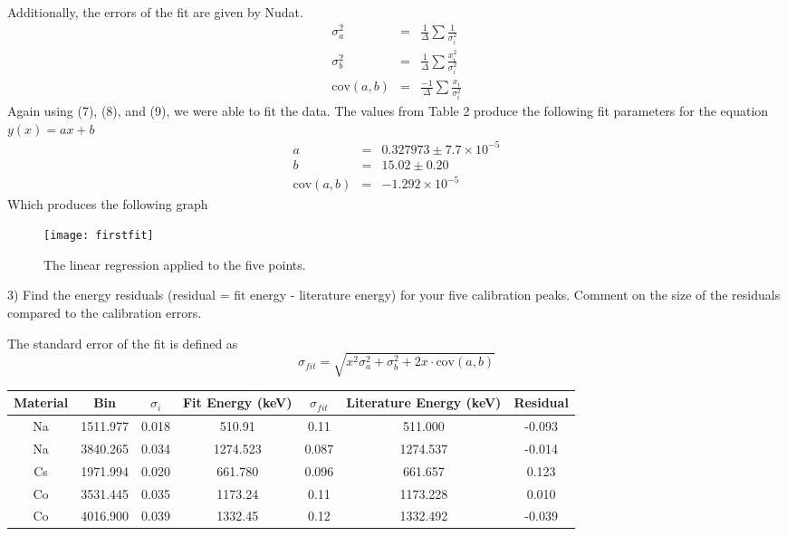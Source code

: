 \documentclass[10pt]{article}
\begin{document}
Additionally, the errors of the fit are given by Nudat.\cite{bevington}
\begin{eqnarray}
\sigma_a^2 &=& \frac{1}{\Delta}\sum\frac{1}{\sigma_i^2} \\
\sigma_b^2 &=& \frac{1}{\Delta}\sum\frac{x_i^2}{\sigma_i^2} \\
\text{cov}(a,b) &=& \frac{-1}{\Delta}\sum\frac{x_i}{\sigma_i^2}
\end{eqnarray}
Again using (7), (8), and (9), we were able to fit the data. The values from Table 2 produce the following fit parameters for the equation $y(x)=ax+b$
\begin{eqnarray}
a&=&0.327973\pm 7.7\times 10^{-5} \\
b&=&15.02\pm 0.20 \\
\text{cov}(a,b)&=&-1.292\times 10^{-5}
\end{eqnarray}
Which produces the following graph \\
\begin{figure}[!h]
\texttt{[image: firstfit]}
\caption{The linear regression applied to the five points.}
\end{figure}
\begin{flushleft}
3) Find the energy residuals (residual = fit energy - literature energy) for your five calibration peaks. Comment on the size of the residuals compared to the calibration errors.
\end{flushleft}
The standard error of the fit is defined as
\begin{equation}
\sigma_{fit} = \sqrt{x^2\sigma_a^2+\sigma_b^2+2x\cdot\text{cov}(a,b)}
\end{equation}
\begin{center}
\begin{tabular}{|c|c|c|c|c|c|c|}
\hline 
Material & Bin & $\sigma_i$ & Fit Energy (keV) & $\sigma_{fit}$ & Literature Energy (keV)\cite{sonzogni} & Residual  \\ 
\hline 
Na & 1511.977 & 0.018 & 510.91 & 0.11 & 511.000 & -0.093 \\ 
\hline 
Na & 3840.265 & 0.034 & 1274.523 & 0.087 & 1274.537 & -0.014 \\ 
\hline 
Cs & 1971.994 & 0.020 & 661.780 & 0.096 & 661.657 & 0.123 \\ 
\hline 
Co & 3531.445 & 0.035 & 1173.24 & 0.11 & 1173.228 & 0.010 \\ 
\hline 
Co & 4016.900 & 0.039 & 1332.45 & 0.12 & 1332.492 & -0.039 \\ 
\hline 
\end{tabular}
\end{center}
\end{document}
